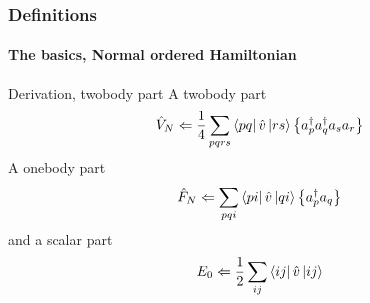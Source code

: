 \begin{frame}[fragile]
    \frametitle{Definitions}
    \framesubtitle{The basics, Normal ordered Hamiltonian}

    \begin{block}{Derivation, twobody part}
    A twobody part
    \begin{equation*}
            \hat{V}_N \Leftarrow \frac{1}{4} \sum_{pqrs} \bra{pq}\hat{v}\,|{rs}\rangle 
                \left\{a^\dagger_p a^\dagger_q a_s  a_r\right\}
    \end{equation*}
    A onebody part
    \begin{equation*}
            \hat{F}_N \Leftarrow \sum_{pqi} \bra{pi}\hat{v}\,|{qi}\rangle \left\{a^\dagger_p a_q\right\}
    \end{equation*}
    and a scalar part
    \begin{equation*}
                E_0 \Leftarrow \frac{1}{2} \sum_{ij} \bra{ij}\hat{v}\,|{ij}\rangle
    \end{equation*}



    \end{block}
\end{frame}

